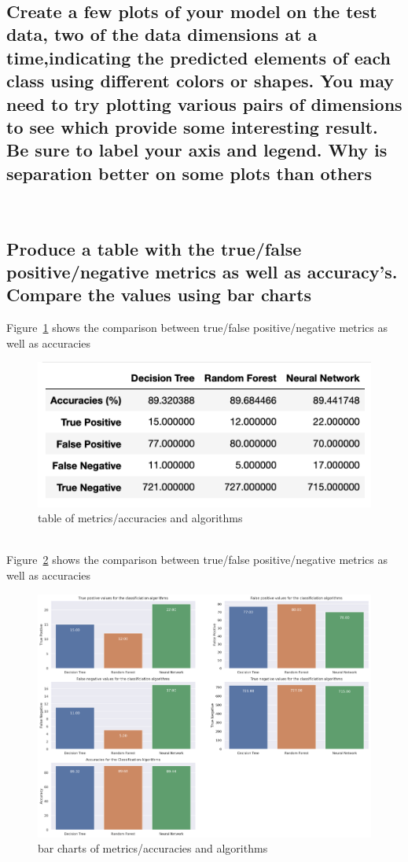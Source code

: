 \\
\subsection{Create a few plots of your model on the test data, two of the data dimensions at a time,indicating the predicted elements of each class using different colors or shapes. You may need to try plotting various pairs of dimensions to see which provide some interesting result. Be sure to label your axis and legend. Why is separation better on some plots than others}

\\



\subsection{Produce a table with the true/false positive/negative metrics as well as accuracy's. Compare the values using bar charts}

Figure~\ref{fig:fig4} shows the comparison between true/false positive/negative metrics as well as accuracies
\begin{figure}[!ht]
 \centering
\includegraphics[width=6.1in]{assignment2/1-5_table.png}
\caption{\label{fig:fig4}table of metrics/accuracies and algorithms}
\end{figure}
\\
Figure~\ref{fig:fig5} shows the comparison between true/false positive/negative metrics as well as accuracies
\begin{figure}[!ht]
 \centering
\includegraphics[width=6.1in]{assignment2/80-20_barcharts_algorithms.png}
\caption{\label{fig:fig5}bar charts of metrics/accuracies and algorithms}
\end{figure}

